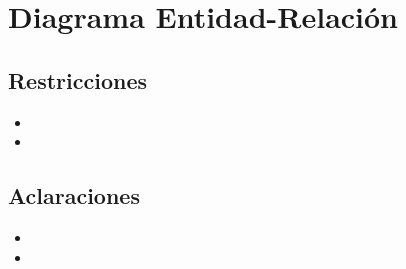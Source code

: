 \section{Diagrama Entidad-Relaci\'on}

\thispagestyle{empty}
  \begin{figure}[H]
    \centering
    \subfloat[der]
    {}
  \end{figure} 

\subsection{Restricciones}
  \begin{itemize}
    \item
    
    \item    
  \end{itemize}

\subsection{Aclaraciones}
  \begin{itemize}
    \item
    
    \item 
            
  \end{itemize}
